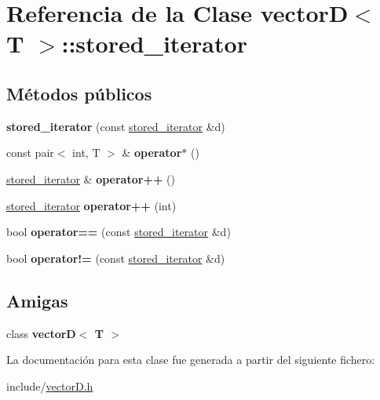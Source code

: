 \hypertarget{classvectorD_1_1stored__iterator}{}\section{Referencia de la Clase vectorD$<$ T $>$\+:\+:stored\+\_\+iterator}
\label{classvectorD_1_1stored__iterator}
\subsection*{Métodos públicos}
\begin{DoxyCompactItemize}
\item 
\mbox{\label{classvectorD_1_1stored__iterator_a196baaac8e149de4d980e4c13da64f89}} 
{\bfseries stored\+\_\+iterator} (const \hyperlink{classvectorD_1_1stored__iterator}{stored\+\_\+iterator} \&d)
\item 
\mbox{\label{classvectorD_1_1stored__iterator_a8cc50eaed49f3d60b8d5583839092a3b}} 
const pair$<$ int, T $>$ \& {\bfseries operator$\ast$} ()
\item 
\mbox{\label{classvectorD_1_1stored__iterator_a5bf12f67de238e1c9aeb305e4cdc967d}} 
\hyperlink{classvectorD_1_1stored__iterator}{stored\+\_\+iterator} \& {\bfseries operator++} ()
\item 
\mbox{\label{classvectorD_1_1stored__iterator_a4d7e6d769583d0eec6c5d458a9dfa3b7}} 
\hyperlink{classvectorD_1_1stored__iterator}{stored\+\_\+iterator} {\bfseries operator++} (int)
\item 
\mbox{\label{classvectorD_1_1stored__iterator_a3cae14b44e457dcee45c78b244e47574}} 
bool {\bfseries operator==} (const \hyperlink{classvectorD_1_1stored__iterator}{stored\+\_\+iterator} \&d)
\item 
\mbox{\label{classvectorD_1_1stored__iterator_aab59a01aa5b62d234355524f305a04d7}} 
bool {\bfseries operator!=} (const \hyperlink{classvectorD_1_1stored__iterator}{stored\+\_\+iterator} \&d)
\end{DoxyCompactItemize}
\subsection*{Amigas}
\begin{DoxyCompactItemize}
\item 
\mbox{\label{classvectorD_1_1stored__iterator_a27e3ba75af96dbb2a41d9c34e758991a}} 
class {\bfseries vector\+D$<$ T $>$}
\end{DoxyCompactItemize}


La documentación para esta clase fue generada a partir del siguiente fichero\+:\begin{DoxyCompactItemize}
\item 
include/\hyperlink{vectorD_8h}{vector\+D.\+h}\end{DoxyCompactItemize}
